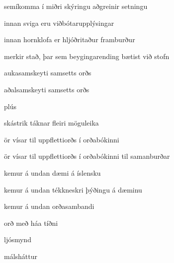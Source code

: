 \item[{;}] {semíkomma í miðri skýringu aðgreinir setningu}

\item[{(...)}] {innan sviga eru viðbótarupplýsingar}
\item[{[...]}] {innan hornklofa er hljóðritaður framburður}
\item[{|}] {merkir stað, þar sem beygingarending bætist við stofn}
\item[{·}] {aukasamskeyti samsetts orðs}
\item[{··}] {aðalsamskeyti samsetts orðs}
\item[{+}] {plús}
\item[{/}] {skástrik táknar fleiri möguleika}
\item[{\dicsymSee}] {ör vísar til uppflettiorðs í orðabókinni}
\item[{\dicsymCompare}] {ör vísar til uppflettiorðs í orðabókinni til samanburðar}
\item[{\dicsymExampleIS}] {kemur á undan dæmi á íslensku}
\item[{\dicsymExampleCS}] {kemur á undan tékkneskri þýðingu á dæminu}
\item[{\dicsymIdiom}] {kemur á undan orðasambandi}
\item[{\dicsymFrequent}] {orð með háa tíðni}

\item[{\dicsymPhoto}] {ljósmynd}
\item[{\dicsymProverb}] {málsháttur}
